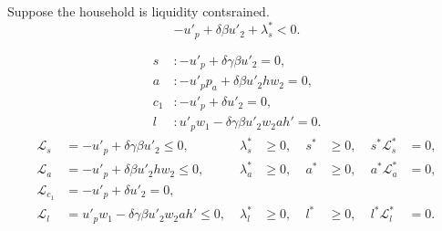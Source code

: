 \begin{frame}{}
Suppose the household is liquidity contsrained.
\[
-u'_{p}+\delta\beta u'_{2}+\lambda_{s}^{*}<0.
\]
\end{frame}
\begin{frame}{}
\[
\begin{aligned}
s&: -u'_{p}+\delta\gamma\beta u'_{2}=0,\\
a&: -u'_{p}p_{a}+\delta\beta u'_{2}hw_{2}=0,\\
c_{1}&: -u'_{p}+\delta u'_{2}=0,\\
l&: u'_{p}w_{1}-\delta\gamma\beta u'_{2}w_{2}ah'=0.
\end{aligned}
\]
\[
\begin{aligned}
\mathcal L_{s}&=-u'_{p}+\delta\gamma\beta u'_{2}\leqslant 0,\; & \lambda_{s}^{*}&\geqslant 0, 
\; & s^{*}&\geqslant 0, \; & s^{*}\mathcal L_{s}^{*}&= 0,\\
\mathcal L_{a}&=-u'_{p}+\delta\beta u'_{2}hw_{2}\leqslant 0,\; & \lambda_{a}^{*}&\geqslant 0, 
\; & a^{*}&\geqslant 0, \; & a^{*}\mathcal L_{a}^{*}&= 0,\\
\mathcal L_{c_{1}}&=-u'_{p}+\delta u'_{2}=0,\\
\mathcal L_{l}&=u'_{p}w_{1}-\delta\gamma\beta u'_{2}w_{2}ah'\leqslant 0,\; & \lambda_{l}^{*}&\geqslant 0, 
\; & l^{*}&\geqslant 0, \; & l^{*}\mathcal L_{l}^{*}&= 0.
\end{aligned}
\]
\end{frame}

